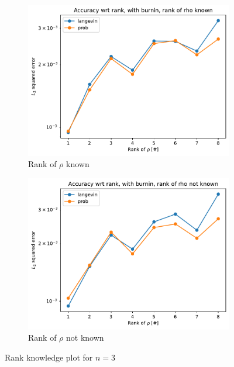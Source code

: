 \documentclass[12pt]{memoir}
\begin{document}
\begin{figure}[H]
    \centering
    \begin{subfigure}[b]{0.49\textwidth}
        \centering
        \includegraphics[width=\textwidth]{figures/experiments/rank_info/rank_known-1.png}
        \caption{Rank of $\rho$ known}
        \label{fig:rank-info-sub}
    \end{subfigure}
    \hfill
    \begin{subfigure}[b]{0.49\textwidth}
        \centering
        \includegraphics[width=\textwidth]{figures/experiments/rank_info/rank_not_known-1.png}
        \caption{Rank of $\rho$ not known}
        \label{fig:rank-no-info-sub}
    \end{subfigure}
    \caption{Rank knowledge plot for $n=3$}
    \label{fig:rank-info}
\end{figure}
\end{document}

